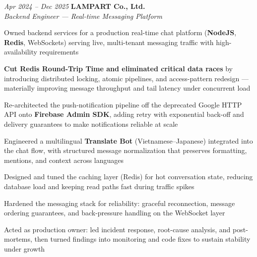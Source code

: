 \begin{twocolentry}{\textit{Apr 2024 -- Dec 2025}}
    \textbf{LAMPART Co., Ltd.} \\[4pt]
    \textit{Backend Engineer — Real-time Messaging Platform}
\end{twocolentry}
\begin{onecolentry}
    \begin{highlights}
        \item Owned backend services for a production real-time chat platform (\textbf{NodeJS}, \textbf{Redis}, WebSockets) serving live, multi-tenant messaging traffic with high-availability requirements
        \item \textbf{Cut Redis Round-Trip Time and eliminated critical data races} by introducing distributed locking, atomic pipelines, and access-pattern redesign — materially improving message throughput and tail latency under concurrent load
        \item Re-architected the push-notification pipeline off the deprecated Google HTTP API onto \textbf{Firebase Admin SDK}, adding retry with exponential back-off and delivery guarantees to make notifications reliable at scale
        \item Engineered a multilingual \textbf{Translate Bot} (Vietnamese--Japanese) integrated into the chat flow, with structured message normalization that preserves formatting, mentions, and context across languages
        \item Designed and tuned the caching layer (Redis) for hot conversation state, reducing database load and keeping read paths fast during traffic spikes
        \item Hardened the messaging stack for reliability: graceful reconnection, message ordering guarantees, and back-pressure handling on the WebSocket layer
        \item Acted as production owner: led incident response, root-cause analysis, and post-mortems, then turned findings into monitoring and code fixes to sustain stability under growth
    \end{highlights}
\end{onecolentry}


